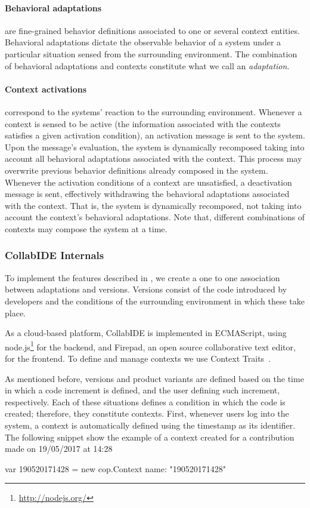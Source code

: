\paragraph{Behavioral adaptations} are fine-grained behavior definitions associated to one or several 
context entities. Behavioral adaptations dictate the observable behavior of a system under a particular 
situation sensed from the surrounding environment. The combination of behavioral adaptations and 
contexts constitute what we call an \emph{adaptation}.

\paragraph{Context activations} correspond to the systems' reaction to the surrounding environment. 
Whenever a context is sensed to be active (the information associated with the contexts satisfies a 
given activation condition), an activation message is sent to the system. Upon the message's 
evaluation, the system is dynamically recomposed taking into account all behavioral adaptations 
associated with the context. This process may overwrite previous behavior definitions already 
composed in the system. Whenever the activation conditions of a context are unsatisfied, a 
deactivation message is sent, effectively withdrawing the behavioral adaptations associated with the 
context. That is, the system is dynamically recomposed, not taking into account the context's 
behavioral adaptations.  Note that, different combinations of contexts may compose the system at a 
time.


\subsubsection{CollabIDE Internals}
To implement the features described in , we create a one to one association 
between adaptations and versions.
Versions consist of the code introduced by developers and the conditions of the surrounding 
environment in which these take place. 

As a cloud-based platform, CollabIDE is implemented in ECMAScript, using 
node.js\footnote{\url{http://nodejs.org/}} for the backend, and 
Firepad, an open source collaborative text editor, for the frontend.
To define and manage contexts we use Context Traits~\cite{gonzalez13}. 

As mentioned before, versions and product variants are defined based on the time in which a code 
increment is defined, and the user defining such increment, respectively. Each of these situations 
defines a condition in which the code is created; therefore, they constitute contexts.
First, whenever users log into the system, a context is automatically defined
using the timestamp as its identifier. The following snippet show the example of a context created 
for a contribution made on 19/05/2017 at 14:28
\vspace{-4ex}
\begin{ctxtraits}
 var 190520171428 = new cop.Context{
   name: "190520171428"
 }
\end{ctxtraits}
\vspace{-4ex}

